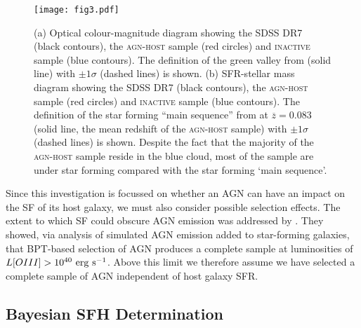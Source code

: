 \documentclass[useAMS,usenatbib]{mn2e}
\def\changed    {\color{nc} }
\def\changedbds    {\color{ncc} }
\def\newref    {\color{new} }
\begin{document}
\begin{figure}
\centering
\texttt{[image: fig3.pdf]}
\caption{{\newref (a) Optical colour-magnitude diagram showing the SDSS DR7 (black contours), the \textsc{agn-host} sample (red circles) and \textsc{inactive} sample (blue contours). The definition of the green valley from \citet{Baldry06} (solid line) with $\pm 1\sigma$ (dashed lines) is shown. (b) SFR-stellar mass diagram showing the SDSS DR7 (black contours), the \textsc{agn-host} sample (red circles) and \textsc{inactive} sample (blue contours). The definition of the star forming ``main sequence'' from \citet{Peng10} at $\overline{z}=0.083$ (solid line, the mean redshift of the \textsc{agn-host} sample) with $\pm 1\sigma$ (dashed lines) is shown. Despite the fact that the majority of the \textsc{agn-host} sample reside in the blue cloud, most of the sample are under star forming compared with the star forming `main sequence'.}}
\label{cmdsfms}
\end{figure}

Since this investigation is focussed on whether an AGN can have an impact on the SF of its host galaxy, we must also consider {\changed possible selection effects}. The extent to which SF {\changedbds could obscure AGN} emission was addressed by \cite{Sch2010}. They showed, via analysis of simulated AGN emission added to star-forming galaxies, that BPT-based selection of AGN produces a complete sample at luminosities of $L[OIII] > 10^{40}~\rm{erg~s}^{-1}$. Above this limit we therefore assume we have selected a complete sample of AGN independent of host galaxy SFR.

\subsection{Bayesian SFH Determination}\label{starpy}

\end{document}
